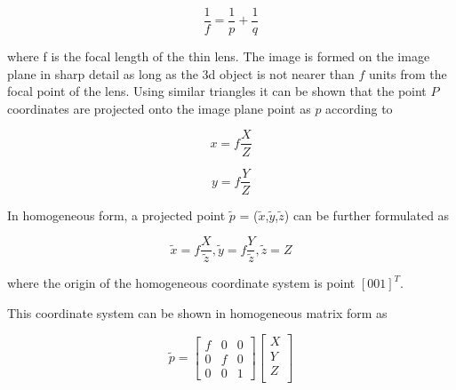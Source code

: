 \documentclass[12pt,a4paper,oneside,pdftex]{report}
\begin{document}
\begin{equation}
\frac{1}{f} = \frac{1}{p} + \frac{1}{q}
\label{eq:lens_law}
\end{equation}

where f is the focal length of the thin lens. The image is formed on the image plane in sharp detail as long as the 3d object is not nearer than $f$ units from the focal point of the lens. Using similar triangles it can be shown that the point $P$ coordinates are projected onto the image plane point as $p$ according to

\begin{equation}
x = f\frac{X}{Z}
\label{eq:image_projection}
\end{equation}

\begin{equation}
y = f\frac{Y}{Z}
\label{eq:image_projection2}
\end{equation}


In homogeneous form, a projected point $\tilde{p}$ = ($\tilde{x}$,$\tilde{y}$,$\tilde{z}$) can be further formulated as

\begin{equation}
\tilde{x} = f\frac{X}{\tilde{z}}, \tilde{y} = f\frac{Y}{\tilde{z}}, \tilde{z} = Z
\label{eq:image_projection}
\end{equation}

where the origin of the homogeneous coordinate system is point $[0 0 1]^T$.


This coordinate system can be shown in homogeneous matrix form as 

\begin{equation} \tilde{p} =
\label{eq:homogeneous_matrix_form}
\begin{bmatrix}
f & 0 & 0 \\
0 & f & 0 \\
0 & 0 & 1\end{bmatrix}
\begin{bmatrix}
X \\
Y \\
Z \\
\end{bmatrix}
\end{equation}
\end{document}
